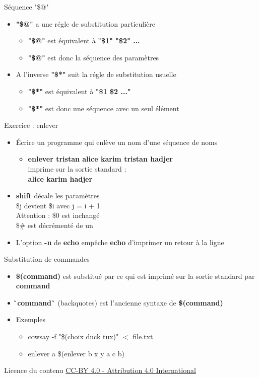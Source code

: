 \documentclass[xcolor=table]{beamer}
\begin{document}
\begin{frame}{Séquence "\$@"}
\begin{itemize}
    \item \textbf{"\$@"} a une régle de substitution particulière
    \begin{itemize}
        \item \textbf{"\$@"} est équivalent à \textbf{"\$1" "\$2" ...}
        \item \textbf{"\$@"} est donc la séquence des paramètres
    \end{itemize}
    \item A l'inverse \textbf{"\$*"} suit la régle de substitution usuelle
    \begin{itemize}
        \item \textbf{"\$*"} est équivalent à \textbf{"\$1 \$2 ..."}
        \item \textbf{"\$*"} est donc une séquence avec un seul élément
    \end{itemize}
\end{itemize}
\end{frame}

\begin{frame}{Exercice : enlever}
\begin{itemize}
    \item Écrire un programme qui enlève un nom d'une séquence de noms
    \begin{itemize}
        \item \textbf{enlever tristan alice karim tristan hadjer}\\
        imprime sur la sortie standard :\\
        \textbf{alice karim hadjer}
    \end{itemize}
    \item \textbf{shift} décale les paramètres\\
    \$j devient \$i avec j = i + 1\\
    Attention : \$0 est inchangé\\
    \$\# est décrémenté de un
    \item L'option \textbf{-n} de \textbf{echo} empêche \textbf{echo} d'imprimer un retour à la ligne
\end{itemize}
\end{frame}

\begin{frame}{Substitution de commandes}
\begin{itemize}
    \item \textbf{\$(command)} est substitué par ce qui est imprimé sur la sortie standard par \textbf{command}
    \item \textbf{\`\,command\`} (backquotes) est l'ancienne syntaxe de \textbf{\$(command)}
    \item Exemples
    \begin{itemize}
        \item cowsay -f "\$(choix duck tux)" $<$ file.txt
        \item enlever a \$(enlever b x y a c b)
    \end{itemize}
\end{itemize}
\end{frame}

\begin{frame}{Licence du contenu}
\href{https://creativecommons.org/licenses/by/4.0/}{CC-BY 4.0 - Attribution 4.0 International}
\end{frame}
\end{document}

